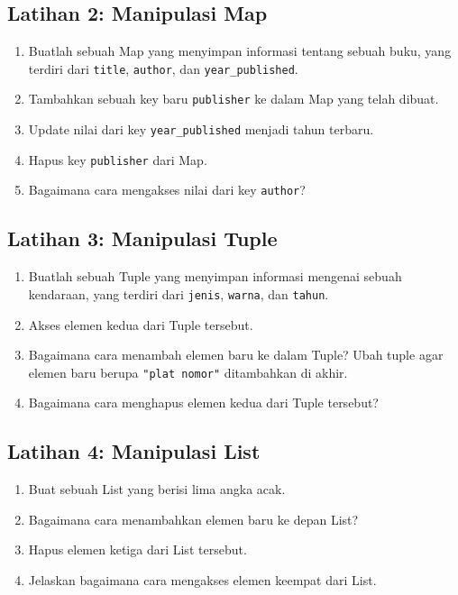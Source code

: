 \subsection{Latihan 2: Manipulasi Map}
\begin{enumerate}
	\item Buatlah sebuah Map yang menyimpan informasi tentang sebuah buku, yang terdiri dari \texttt{title}, \texttt{author}, dan \texttt{year\_published}.
	\item Tambahkan sebuah key baru \texttt{publisher} ke dalam Map yang telah dibuat.
	\item Update nilai dari key \texttt{year\_published} menjadi tahun terbaru.
	\item Hapus key \texttt{publisher} dari Map.
	\item Bagaimana cara mengakses nilai dari key \texttt{author}?
\end{enumerate}

\subsection{Latihan 3: Manipulasi Tuple}
\begin{enumerate}
	\item Buatlah sebuah Tuple yang menyimpan informasi mengenai sebuah kendaraan, yang terdiri dari \texttt{jenis}, \texttt{warna}, dan \texttt{tahun}.
	\item Akses elemen kedua dari Tuple tersebut.
	\item Bagaimana cara menambah elemen baru ke dalam Tuple? Ubah tuple agar elemen baru berupa \texttt{"plat nomor"} ditambahkan di akhir.
	\item Bagaimana cara menghapus elemen kedua dari Tuple tersebut?
\end{enumerate}

\subsection{Latihan 4: Manipulasi List}
\begin{enumerate}
	\item Buat sebuah List yang berisi lima angka acak.
	\item Bagaimana cara menambahkan elemen baru ke depan List?
	\item Hapus elemen ketiga dari List tersebut.
	\item Jelaskan bagaimana cara mengakses elemen keempat dari List.
\end{enumerate}


